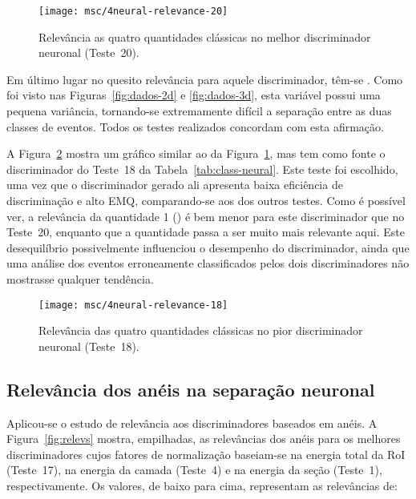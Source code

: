 \begin{figure}
\begin{center}
\texttt{[image: msc/4neural-relevance-20]}
\end{center}
\caption{Relevância as quatro quantidades clássicas no melhor discriminador
neuronal (Teste~20).}
\label{fig:class-relev}
\end{figure}

Em último lugar no quesito relevância para aquele discriminador, têm-se
\rstrip. Como foi visto nas Figuras~\ref{fig:dados-2d} e \ref{fig:dados-3d},
esta variável possui uma pequena variância, tornando-se extremamente difícil a
separação entre as duas classes de eventos. Todos os testes realizados
concordam com esta afirmação.

A Figura~\ref{fig:class-relev-worst} mostra um gráfico similar ao da
Figura~\ref{fig:class-relev}, mas tem como fonte o discriminador do Teste~18
da Tabela~\ref{tab:class-neural}. Este teste foi escolhido, uma vez que o
discriminador gerado ali apresenta baixa eficiência de discriminação e alto
EMQ, comparando-se aos dos outros testes. Como é possível ver, a relevância da
quantidade 1 (\etem) é bem menor para este discriminador que no Teste~20,
enquanto que a quantidade \ethad passa a ser muito mais relevante aqui. Este
desequilíbrio possivelmente influenciou o desempenho do discriminador, ainda
que uma análise dos eventos erroneamente classificados pelos dois
discriminadores não mostrasse qualquer tendência.

\begin{figure}
\begin{center}
\texttt{[image: msc/4neural-relevance-18]}
\end{center}
\caption{Relevância das quatro quantidades clássicas no pior discriminador
neuronal (Teste~18).}
\label{fig:class-relev-worst}
\end{figure}

\subsection{Relevância dos anéis na separação neuronal}

Aplicou-se o estudo de relevância aos discriminadores baseados em anéis. A
Figura~\ref{fig:relevs} mostra, empilhadas, as relevâncias dos anéis para os
melhores discriminadores cujos fatores de normalização baseiam-se na energia
total da RoI (Teste~17), na energia da camada (Teste~4) e na energia da seção
(Teste~1), respectivamente. Os valores, de baixo para cima, representam as
relevâncias de:


